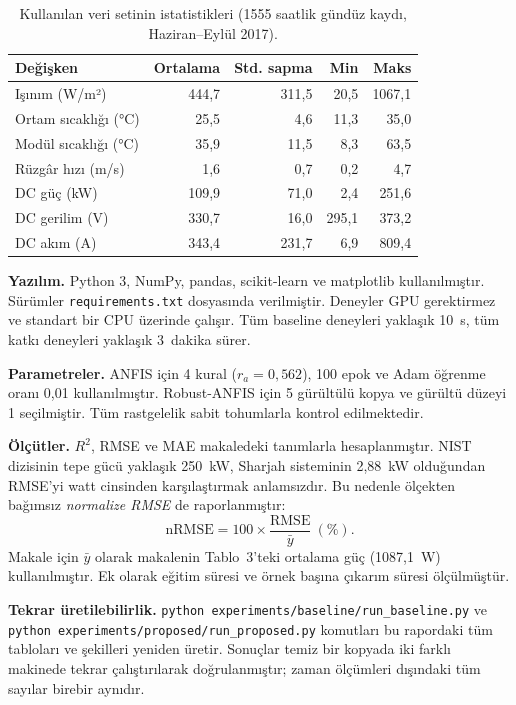 \documentclass[11pt,a4paper]{article}
\begin{document}
\begin{table}[H]
\centering\small
\caption{Kullanılan veri setinin istatistikleri (1555 saatlik gündüz kaydı, Haziran–Eylül 2017).}
\label{tab:stats}
\begin{tabular}{@{}lrrrr@{}}
\toprule
Değişken & Ortalama & Std. sapma & Min & Maks \\
\midrule
Işınım (W/m²) & 444,7 & 311,5 & 20,5 & 1067,1 \\
Ortam sıcaklığı (°C) & 25,5 & 4,6 & 11,3 & 35,0 \\
Modül sıcaklığı (°C) & 35,9 & 11,5 & 8,3 & 63,5 \\
Rüzgâr hızı (m/s) & 1,6 & 0,7 & 0,2 & 4,7 \\
DC güç (kW) & 109,9 & 71,0 & 2,4 & 251,6 \\
DC gerilim (V) & 330,7 & 16,0 & 295,1 & 373,2 \\
DC akım (A) & 343,4 & 231,7 & 6,9 & 809,4 \\
\bottomrule
\end{tabular}
\end{table}

\textbf{Yazılım.} Python 3, NumPy, pandas, scikit-learn ve matplotlib kullanılmıştır. Sürümler \texttt{requirements.txt} dosyasında verilmiştir. Deneyler GPU gerektirmez ve standart bir CPU üzerinde çalışır. Tüm baseline deneyleri yaklaşık 10~s, tüm katkı deneyleri yaklaşık 3~dakika sürer.

\textbf{Parametreler.} ANFIS için 4 kural ($r_a=0{,}562$), 100 epok ve Adam öğrenme oranı 0,01 kullanılmıştır. Robust-ANFIS için 5 gürültülü kopya ve gürültü düzeyi 1 seçilmiştir. Tüm rastgelelik sabit tohumlarla kontrol edilmektedir.

\textbf{Ölçütler.} $R^2$, RMSE ve MAE makaledeki tanımlarla hesaplanmıştır. NIST dizisinin tepe gücü yaklaşık 250~kW, Sharjah sisteminin 2,88~kW olduğundan RMSE'yi watt cinsinden karşılaştırmak anlamsızdır. Bu nedenle ölçekten bağımsız \emph{normalize RMSE} de raporlanmıştır:
\begin{equation}
\mathrm{nRMSE}=100\times\frac{\mathrm{RMSE}}{\bar y}\ (\%).
\end{equation}
Makale için $\bar y$ olarak makalenin Tablo~3'teki ortalama güç (1087,1~W) kullanılmıştır. Ek olarak eğitim süresi ve örnek başına çıkarım süresi ölçülmüştür.

\textbf{Tekrar üretilebilirlik.} \texttt{python experiments/baseline/run\_baseline.py} ve \texttt{python experiments/proposed/run\_proposed.py} komutları bu rapordaki tüm tabloları ve şekilleri yeniden üretir. Sonuçlar temiz bir kopyada iki farklı makinede tekrar çalıştırılarak doğrulanmıştır; zaman ölçümleri dışındaki tüm sayılar birebir aynıdır.
\end{document}
